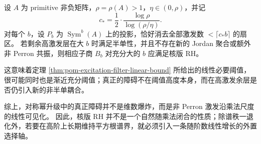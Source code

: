 \begin{conjecture}[线性激发过滤下界的渐近充分性]\label{conj:conclusion-linear-excitation-threshold-asymptotically-sufficient}
设 \(A\) 为 primitive 非负矩阵，\(\rho=\rho(A)>1\)，\(\eta\in(0,\rho)\)，并记
\[
c_\ast=\frac12\cdot\frac{\log\rho}{\log(\rho/\eta)}.
\]
对每个 \(b\)，设 \(P_b\) 为 \(\operatorname{Sym}^b(A)\) 上的投影，恰好消去全部激发数 \(<\lceil c_\ast b\rceil\) 的扇区。
若剩余高激发层在大 \(b\) 时满足半单性，并且不存在新的 Jordan 聚合或额外非 Perron 共振，则相应子商 \(B_b\) 对充分大的 \(b\) 应满足核版 RH。

这意味着定理 \ref{thm:pom-excitation-filter-linear-bound} 所给出的线性必要阈值，很可能同时也是渐近充分阈值；真正的障碍不在阈值高度本身，而在高激发余层是否仍引入新的非半单耦合。
\end{conjecture}

综上，对称幂升级中的真正障碍并不是维数爆炸，而是非 Perron 激发沿乘法尺度的线性可见化。
因此，核版 RH 并不是一个自然随乘法闭合的性质；除谱秩一退化外，若要在高阶上长期维持平方根谱界，就必须引入一条随阶数线性增长的外置选择轴。
